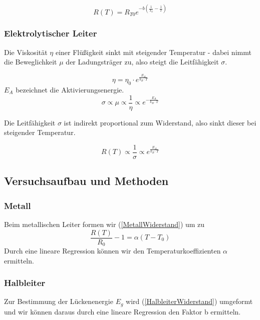 \documentclass{article}
\begin{document}
\begin{equation}
\label{HalbleiterWiderstand}
R(T)=R_{T0}e^{-b(\frac{1}{T_0}-\frac{1}{T})}
\end{equation}

\subsubsection*{Elektrolytischer Leiter}

Die Viskosität $\eta$ einer Flüßigkeit sinkt mit steigender Temperatur - dabei nimmt die Beweglichkeit $\mu$ der Ladungsträger zu, also steigt die Leitfähigkeit $\sigma$.

\begin{equation}
\label{Viskositaet}
\eta = \eta_0 \cdot e^{\frac{E_A}{k_B \cdot T}}
\end{equation}
$E_A$ bezeichnet die Aktivierungsenergie.
\begin{equation}
\label{LeitfaehigkeitElektrolyt}
\sigma  \propto \mu \propto \frac{1}{\eta} \propto e^{-\frac{E_A}{k_B \cdot T}}
\end{equation}

Die Leitfähigkeit $\sigma$ ist indirekt proportional zum Widerstand, also sinkt dieser bei steigender Temperatur.

\begin{equation}
\label{WiderstandElektrolyt}
R(T) \propto \frac{1}{\sigma} \propto e^{\frac{E_A}{k_B \cdot T}}
\end{equation}

\subsection{Versuchsaufbau und Methoden}
\subsubsection*{Metall}
Beim metallischen Leiter formen wir (\ref{MetallWiderstand}) um zu 
\begin{equation}
\label{alpha-metall}
\frac{R(T)}{R_0}-1=\alpha(T-T_0)
\end{equation}
Durch eine lineare Regression können wir den Temperaturkoeffizienten $\alpha$ ermitteln.
\subsubsection*{Halbleiter}
Zur Bestimmung der Lückenenergie $E_g$ wird (\ref{HalbleiterWiderstand}) umgeformt und wir können daraus durch eine lineare Regression den Faktor b ermitteln.
\end{document}
